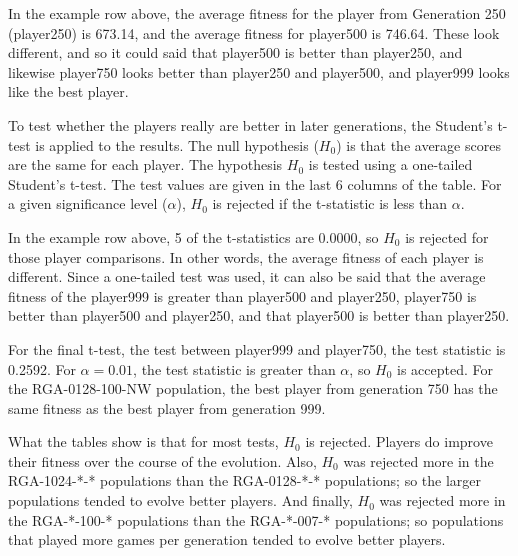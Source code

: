 \begin{landscape}
In the example row above, the average fitness for the player from Generation 250
(player250) is 673.14, and the average fitness for player500 is 746.64. These
look different, and so it could said that player500 is better than player250, and
likewise player750 looks better than player250 and player500, and player999
looks like the best player. 

To test whether the players really are better in later generations, the
Student's t-test is applied to the results. The null hypothesis ($H_{0}$) is
that the average scores are the same for each player. The hypothesis $H_{0}$ 
is tested using a one-tailed Student's t-test. The test values are given in the
last 6 columns of the table. For a given significance level ($\alpha$), $H_{0}$
is rejected if the t-statistic is less than $\alpha$.

In the example row above, 5 of the t-statistics are 0.0000, so $H_{0}$ is
rejected for those player comparisons. In other words, the average fitness of
each player is different. Since a one-tailed test was used, it can also be said
that the average fitness of the player999 is greater than player500 and
player250, player750 is better than player500 and player250, and that player500
is better than player250.

For the final t-test, the test between player999 and player750, the test
statistic is 0.2592. For \(\alpha=0.01\), the test statistic is greater than
\(\alpha\), so $H_{0}$ is accepted. For the RGA-0128-100-NW population, the best
player from generation 750 has the same fitness as the best player from
generation 999.

What the tables show is that for most tests, $H_{0}$ is rejected. Players do
improve their fitness over the course of the evolution. Also, $H_{0}$ was
rejected more in the RGA-1024-*-* populations than the RGA-0128-*-* populations;
so the larger populations tended to evolve better players. And finally, $H_{0}$
was rejected more in the RGA-*-100-* populations than the RGA-*-007-*
populations; so populations that played more games per generation tended to
evolve better players.

\clearpage


\end{landscape}
